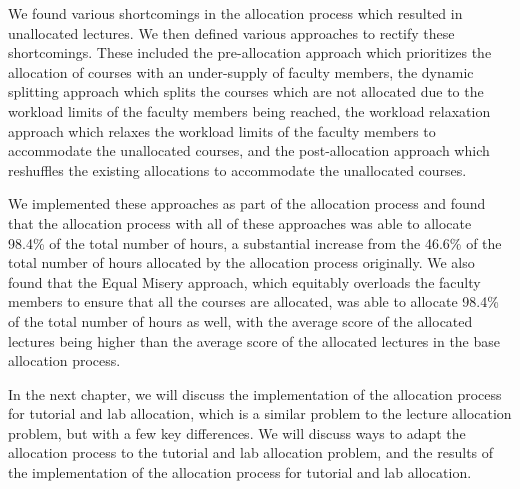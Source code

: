 We found various shortcomings in the allocation process which resulted in unallocated lectures. We then defined various approaches to rectify these shortcomings. These included the pre-allocation approach which prioritizes the allocation of courses with an under-supply of faculty members, the dynamic splitting approach which splits the courses which are not allocated due to the workload limits of the faculty members being reached, the workload relaxation approach which relaxes the workload limits of the faculty members to accommodate the unallocated courses, and the post-allocation approach which reshuffles the existing allocations to accommodate the unallocated courses.

We implemented these approaches as part of the allocation process and found that the allocation process with all of these approaches was able to allocate 98.4\% of the total number of hours, a substantial increase from the 46.6\% of the total number of hours allocated by the allocation process originally. We also found that the Equal Misery approach, which equitably overloads the faculty members to ensure that all the courses are allocated, was able to allocate 98.4\% of the total number of hours as well, with the average score of the allocated lectures being higher than the average score of the allocated lectures in the base allocation process.

In the next chapter, we will discuss the implementation of the allocation process for tutorial and lab allocation, which is a similar problem to the lecture allocation problem, but with a few key differences. We will discuss ways to adapt the allocation process to the tutorial and lab allocation problem, and the results of the implementation of the allocation process for tutorial and lab allocation.
